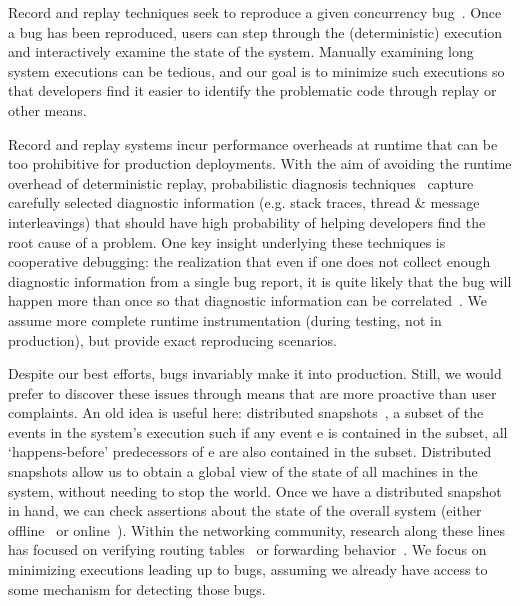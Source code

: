  Record and replay
techniques seek to reproduce a given concurrency
bug~\cite{zamfir2011debug,Zamfir:2010:EST:1755913.1755946,altekar2009odr,park2009pres,Yuan:2010:SED:1736020.1736038,ofrewind}.
Once a bug has been
reproduced, users can step through the (deterministic) execution and interactively examine the
state of the system.
Manually examining long system executions can be tedious, and our goal is to
minimize such executions so that developers find it easier to identify the
problematic code through replay or other means.

 Record and replay systems incur
performance overheads at runtime that can be too prohibitive for production deployments.
With the aim of avoiding the runtime overhead of deterministic replay, probabilistic diagnosis
techniques~\cite{Yuan:2010:SED:1736020.1736038,sangmin,kasikci2015failure}
capture carefully selected diagnostic information (e.g. stack traces,
thread \& message interleavings) that should have high
probability of helping developers find the root cause of a problem. One key insight
underlying these techniques is cooperative debugging: the realization that
even if one does not collect enough diagnostic information from a single bug report,
it is quite likely that the bug will happen more than once so that diagnostic
information can be correlated~\cite{coop_debugging}.
We assume more complete runtime instrumentation (during testing, not in production), but provide exact reproducing scenarios.

 Despite our best efforts, bugs invariably make it into production. Still,
we would prefer to discover these issues through means that are more
proactive than user complaints. An old idea is useful here: distributed
snapshots~\cite{Chandy:1985:DSD:214451.214456},
a subset of the events in
the system's execution such if any event e is contained in the subset, all
`happens-before' predecessors of e are also contained in the subset.
Distributed snapshots allow us to obtain a global view of the state of all
machines in the system, without needing to stop the world. Once we have a
distributed snapshot in hand, we can check assertions about the state of the
overall system (either offline~\cite{Liu07widschecker} or online~\cite{d3s}).
Within the networking community, research along these lines has focused on
verifying routing tables~\cite{hsa,hsa_realtime,anteater,khurshid2012veriflow}
or forwarding behavior~\cite{Zeng:2012:ATP:2413176.2413205,libra}. We focus on
minimizing executions leading up to bugs, assuming we already have access to
some mechanism for detecting those bugs.


